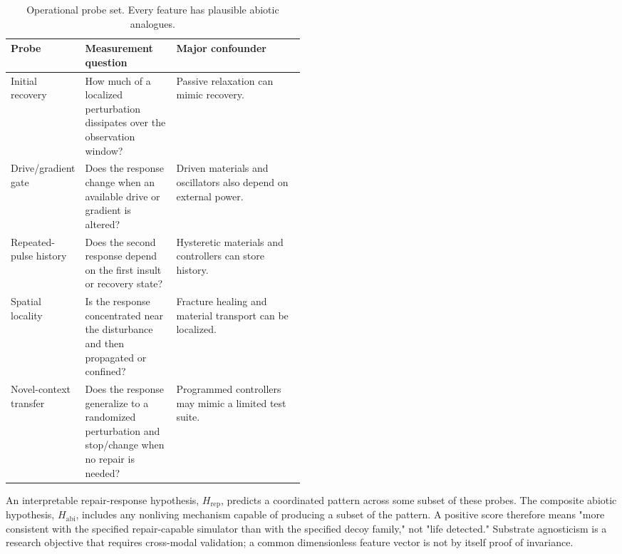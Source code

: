 \documentclass[11pt]{article}
\newcommand{\Hrep}{H_{\mathrm{rep}}}
\newcommand{\Habi}{H_{\mathrm{abi}}}
\begin{document}
\begin{table}[htbp]
\centering\small
\caption{Operational probe set. Every feature has plausible abiotic analogues.}
\label{tab:probes}
\begin{tabularx}{\linewidth}{p{0.17\linewidth}p{0.31\linewidth}X}
\toprule
Probe & Measurement question & Major confounder \\
\midrule
Initial recovery & How much of a localized perturbation dissipates over the observation window? & Passive relaxation can mimic recovery. \\
Drive/gradient gate & Does the response change when an available drive or gradient is altered? & Driven materials and oscillators also depend on external power. \\
Repeated-pulse history & Does the second response depend on the first insult or recovery state? & Hysteretic materials and controllers can store history. \\
Spatial locality & Is the response concentrated near the disturbance and then propagated or confined? & Fracture healing and material transport can be localized. \\
Novel-context transfer & Does the response generalize to a randomized perturbation and stop/change when no repair is needed? & Programmed controllers may mimic a limited test suite. \\
\bottomrule
\end{tabularx}
\end{table}

An interpretable repair-response hypothesis, $\Hrep$, predicts a coordinated pattern across some subset of these probes. The composite abiotic hypothesis, $\Habi$, includes any nonliving mechanism capable of producing a subset of the pattern. A positive score therefore means "more consistent with the specified repair-capable simulator than with the specified decoy family," not "life detected." Substrate agnosticism is a research objective that requires cross-modal validation; a common dimensionless feature vector is not by itself proof of invariance.
\end{document}
